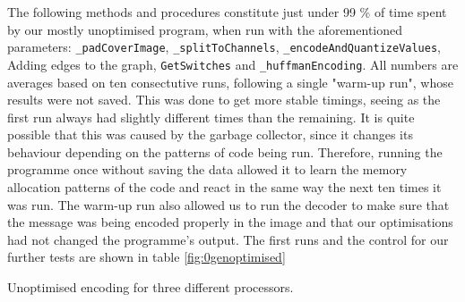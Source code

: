The following methods and procedures constitute just under 99 \% of time spent by our mostly unoptimised program, when run with the aforementioned parameters:
\lstinline|_padCoverImage|, \lstinline|_splitToChannels|, \lstinline|_encodeAndQuantizeValues|, Adding edges to the graph, \lstinline|GetSwitches| and \lstinline|_huffmanEncoding|.
All numbers are averages based on ten consectutive runs, following a single "warm-up run", whose results were not saved.
This was done to get more stable timings, seeing as the first run always had slightly different times than the remaining.
It is quite possible that this was caused by the garbage collector, since it changes its behaviour depending on the patterns of code being run.
Therefore, running the programme once without saving the data allowed it to learn the memory allocation patterns of the code and react in the same way the next ten times it was run.
The warm-up run also allowed us to run the decoder to make sure that the message was being encoded properly in the image and that our optimisations had not changed the programme's output.
The first runs and the control for our further tests are shown in table \ref{fig:0genoptimised}

\begin{threeparttable}[]
    \centering
    \caption{Unoptimised encoding for three different processors.}
    \label{fig:0genoptimised}
\end{threeparttable}

